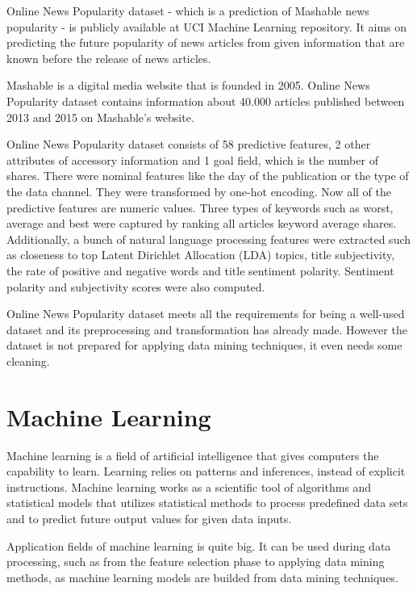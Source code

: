 Online News Popularity dataset \cite{Fernandes2015API} - which is a prediction of Mashable news popularity - is publicly available at UCI Machine Learning repository. It aims on predicting the future popularity of news articles from given information that are known before the release of news articles. \smallskip

Mashable is a digital media website that is founded in 2005. Online News Popularity dataset \cite{inproceedings} contains information about 40.000 articles published between 2013 and 2015 on Mashable's website. \smallskip

Online News Popularity dataset consists of 58 predictive features, 2 other attributes of accessory information and 1 goal field, which is the number of shares. There were nominal features like the day of the publication or the type of the data channel. They were transformed by one-hot encoding. Now all of the predictive features are numeric values. Three types of keywords such as worst, average and best were captured by ranking all articles keyword average shares. Additionally, a bunch of natural language processing features were extracted such as closeness to top Latent Dirichlet Allocation (LDA) topics, title subjectivity, the rate of positive and negative words and title sentiment polarity. Sentiment polarity and subjectivity scores were also computed.\smallskip

Online News Popularity dataset meets all the requirements for being a well-used dataset and its preprocessing and transformation has already made. However the dataset is not prepared for applying data mining techniques, it even needs some cleaning.



\section{Machine Learning}

Machine learning is a field of artificial intelligence that gives computers the capability to learn. Learning relies on patterns and inferences, instead of explicit instructions. Machine learning works as a scientific tool of algorithms and statistical models that utilizes statistical methods to process predefined data sets and to predict future output values for given data inputs. \medskip

Application fields of machine learning is quite big. It can be used during data processing, such as from the feature selection phase to applying data mining methods, as machine learning models are builded from data mining techniques. 

